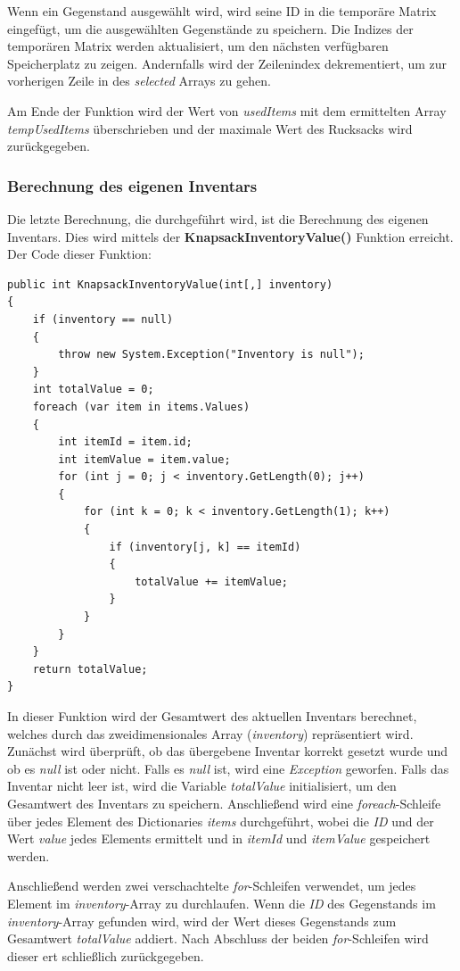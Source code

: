 Wenn ein Gegenstand ausgewählt wird, wird seine ID in die temporäre Matrix eingefügt, um die ausgewählten Gegenstände zu
speichern. Die Indizes der temporären Matrix werden aktualisiert, um den nächsten verfügbaren Speicherplatz zu zeigen.
Andernfalls wird der Zeilenindex dekrementiert, um zur vorherigen Zeile in des \textit{selected} Arrays zu gehen.

Am Ende der Funktion wird der Wert von \textit{usedItems} mit dem ermittelten Array \textit{tempUsedItems} überschrieben
und der maximale Wert des Rucksacks wird zurückgegeben.

\subsubsection{Berechnung des eigenen Inventars}
Die letzte Berechnung, die durchgeführt wird, ist die Berechnung des eigenen Inventars. Dies wird mittels der \textbf{KnapsackInventoryValue()}
Funktion erreicht. Der Code dieser Funktion:
\begin{lstlisting}[style=csharp, caption={Funktion um eigenes Inventar zu brechnen}]
public int KnapsackInventoryValue(int[,] inventory)
{
    if (inventory == null)
    {
        throw new System.Exception("Inventory is null");
    }
    int totalValue = 0;
    foreach (var item in items.Values)
    {
        int itemId = item.id;
        int itemValue = item.value;
        for (int j = 0; j < inventory.GetLength(0); j++)
        {
            for (int k = 0; k < inventory.GetLength(1); k++)
            {
                if (inventory[j, k] == itemId)
                {
                    totalValue += itemValue;
                }
            }
        }
    }
    return totalValue;
}
\end{lstlisting}
In dieser Funktion wird der Gesamtwert des aktuellen Inventars berechnet, welches durch das zweidimensionales Array
(\textit{inventory}) repräsentiert wird. Zunächst wird überprüft, ob das übergebene Inventar korrekt gesetzt wurde und
ob es \textit{null} ist oder nicht. Falls es \textit{null} ist, wird eine \textit{Exception} geworfen. Falls das Inventar
nicht leer ist, wird die Variable \textit{totalValue} initialisiert, um den Gesamtwert des Inventars zu speichern.
Anschließend wird eine \textit{foreach}-Schleife über jedes Element des Dictionaries \textit{items} durchgeführt, wobei
die \textit{ID} und der Wert \textit{value} jedes Elements ermittelt und in \textit{itemId} und \textit{itemValue}
gespeichert werden.

Anschließend werden zwei verschachtelte \textit{for}-Schleifen verwendet, um jedes Element im \textit{inventory}-Array
zu durchlaufen. Wenn die \textit{ID} des Gegenstands im \textit{inventory}-Array gefunden wird, wird der Wert dieses
Gegenstands zum Gesamtwert \textit{totalValue} addiert. Nach Abschluss der beiden \textit{for}-Schleifen wird dieser
ert schließlich zurückgegeben.

